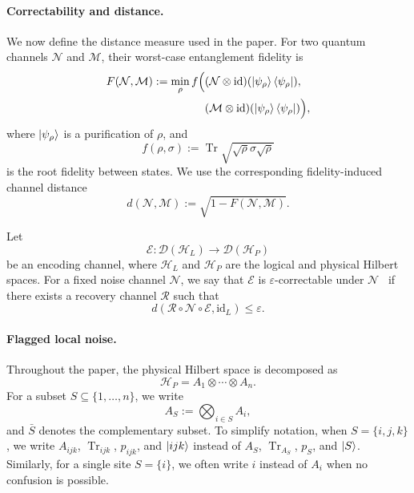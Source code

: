 \documentclass[10pt,twocolumn,superscriptaddress,aps,amsmath,amssymb,citeautoscript,floatfix,prx,longbibliography]{revtex4-2}
\theoremstyle{plain}
\theoremstyle{plain}
\theoremstyle{plain}
\theoremstyle{plain}
\theoremstyle{plain}
\theoremstyle{plain}
\begin{document}
\paragraph{Correctability and distance.} 
We now define the distance measure used in the paper. For two quantum channels $\mathcal N$ and $\mathcal M$, their worst-case entanglement fidelity is
$$
\begin{aligned}
F(\mathcal N,\mathcal M)
:=
\min_\rho
f\Big(
&(\mathcal N\otimes\mathrm{id})
(\ket{\psi_\rho}\bra{\psi_\rho}),
\\
&(\mathcal M\otimes\mathrm{id})
(\ket{\psi_\rho}\bra{\psi_\rho})
\Big),
\end{aligned}
$$
where $\ket{\psi_\rho}$ is a purification of $\rho$, and
$$
f(\rho,\sigma)
:=
\operatorname{Tr}
\sqrt{\sqrt\rho\sigma\sqrt\rho}
$$
is the root fidelity between states. We use the corresponding fidelity-induced channel distance
\begin{equation}\label{eq:distance_def}
d(\mathcal N,\mathcal M)
:=
\sqrt{1-F(\mathcal N,\mathcal M)} .
\end{equation}

Let
$$
\mathcal E:
\mathcal D(\mathcal H_L)
\to
\mathcal D(\mathcal H_P)
$$
be an encoding channel, where $\mathcal H_L$ and $\mathcal H_P$ are the logical and physical Hilbert spaces. For a fixed noise channel $\mathcal N$, we say that $\mathcal E$ is $\varepsilon$-correctable under $\mathcal N$~\cite{Beny2010} if there exists a recovery channel $\mathcal R$ such that
$$
d(\mathcal R\circ\mathcal N\circ\mathcal E,\mathrm{id}_L)
\le
\varepsilon .
$$

\paragraph{Flagged local noise.}

Throughout the paper, the physical Hilbert space is decomposed as
$$
    \mathcal H_P
    =
    A_1\otimes\cdots\otimes A_n .
$$
For a subset $S\subseteq\{1,\ldots,n\}$, we write
$$
    A_S
    :=
    \bigotimes_{i\in S}A_i,
$$
and $\bar S$ denotes the complementary subset. To simplify notation, when $S=\{i,j,k\}$, we write $A_{ijk}$, $\operatorname{Tr}_{ijk}$, $p_{ijk}$, and $\ket{ijk}$ instead of $A_S$, $\operatorname{Tr}_{A_S}$, $p_S$, and $\ket S$. Similarly, for a single site $S=\{i\}$, we often write $i$ instead of $A_i$ when no confusion is possible.
\end{document}
